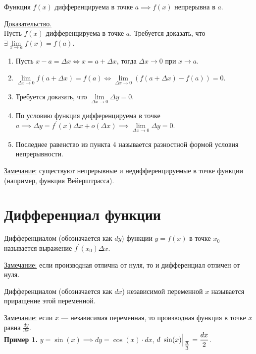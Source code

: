 \documentclass{article}
\begin{document}
\begin{theorem}
    Функция \(f(x)\) дифференцируема в точке \(a \implies f(x)\) непрерывна в \(a\).   
\end{theorem}
\noindent
\underline{Доказательство.}\\[0.1cm]
Пусть \(f(x)\) дифференцируема в точке \(a\). Требуется доказать, что \(\exists \lim\limits_{x \to a}f(x) = f(a)\).
\begin{enumerate}
    \item Пусть \(x - a = \Delta x \iff x = a + \Delta x\), тогда \(\Delta x \to 0\) при \(x \to a\).
    \item \(\lim\limits_{\Delta x \to 0} f(a + \Delta x) = f(a) \iff \lim\limits_{\Delta x \to 0} \left(f(a + \Delta x) - f(a)\right) = 0\).
    \item Требуется доказать, что \(\lim\limits_{\Delta x \to 0} \Delta y = 0\).
    \item По условию функция дифференцируема в точке \(a \implies \Delta y = f^{\prime}(x) \Delta x + o(\Delta x) \implies \lim\limits_{\Delta x \to 0} \Delta y = 0\).
    \item Последнее равенство из пункта 4 называется разностной формой условия непрерывности.
\end{enumerate}
\underline{Замечание:} существуют непрерывные и недифференцируемые в точке функции (например, функция Вейерштрасса).

\section*{Дифференциал функции}
\begin{definition}
    Дифференциалом (обозначается как \(dy\)) функции \(y = f(x)\) в точке \(x_0\) называется выражение \(f^{\prime}(x_0) \Delta x\).
\end{definition}
\noindent
\underline{Замечание:} если производная отлична от нуля, то и дифференциал отличен от нуля.

\begin{definition}
    Дифференциалом (обозначается как \(dx\)) независимой переменной \(x\) называется приращение этой переменной. 
\end{definition}
\noindent
\underline{Замечание:} если \(x\) --- независимая переменная, то производная функция в точке \(x\) равна \(\displaystyle \frac{dy}{dx}\).\\
\textbf{Пример 1.} \(y = \sin(x) \implies dy = \cos(x) \cdot dx\), \(\displaystyle \at{d\ \sin(x)}{\frac{\pi}{3}} = \frac{dx}{2}\).
\end{document}
